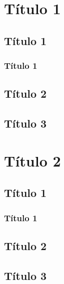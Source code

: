 \documentclass[oneside]{book}
\begin{document}
	
	\tableofcontents

	\pagestyle{HojaContenido}
		
	\chapter{Título 1}
	
	\section{Título 1}
	
	\lipsum[2]

	\subsection{Título 1}
	
	\lipsum[2]

	\section{Título 2}

	\lipsum[2]

	\section{Título 3}
	\lipsum[2]
	

	\chapter{Título 2}
	
	\section{Título 1}
	
	\lipsum[2]
	
	\subsection{Título 1}
	
	\lipsum[2]
	
	\section{Título 2}
	
	\lipsum[2]
	
	\section{Título 3}
	\lipsum[2]
	
\end{document}
